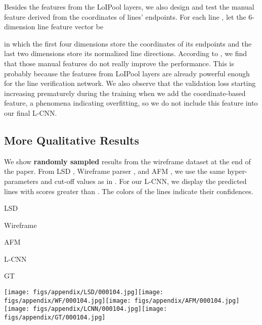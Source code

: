 \documentclass[10pt,twocolumn,letterpaper]{article}
\begin{document}
Besides the features from the LoIPool layers, we also design and test the manual feature derived from the coordinates of lines' endpoints.  For each line , let the 6-dimension line feature vector be

in which the first four dimensions store the coordinates of its endpoints and the last two dimensions store its normalized line directions.  According to , we find that those manual features do not really improve the performance.  This is probably because the features from LoIPool layers are already powerful enough for the line verification network.  We also observe that the validation loss starting increasing prematurely during the training when we add the coordinate-based feature, a phenomena indicating overfitting, so we do not include this feature into our final L-CNN.

\subsection{More Qualitative Results}

We show \textbf{randomly sampled} results from the wireframe dataset at the end of the paper.  From LSD \cite{von2010lsd}, Wireframe parser \cite{Huang:2018:LPW}, and AFM \cite{xue2018learning}, we use the same hyper-parameters and cut-off values as in \cite{xue2018learning}.  For our L-CNN, we display the predicted lines with scores greater than .  The colors of the lines indicate their confidences. 



\onecolumn
\centering

\begin{minipage}[t]{0.19\linewidth}\centering LSD\end{minipage}\begin{minipage}[t]{0.19\linewidth}\centering Wireframe\end{minipage}\begin{minipage}[t]{0.19\linewidth}\centering AFM\end{minipage}\begin{minipage}[t]{0.19\linewidth}\centering L-CNN\end{minipage}\begin{minipage}[t]{0.19\linewidth}\centering GT\end{minipage}

\texttt{[image: figs/appendix/LSD/000104.jpg]}\texttt{[image: figs/appendix/WF/000104.jpg]}\texttt{[image: figs/appendix/AFM/000104.jpg]}\texttt{[image: figs/appendix/LCNN/000104.jpg]}\texttt{[image: figs/appendix/GT/000104.jpg]}
\end{document}
